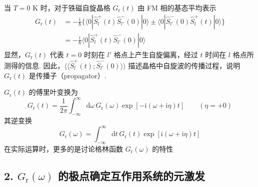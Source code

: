 当 $T=0$ K 时，对于铁磁自旋晶格 $G_{\mathrm{r}}(t)$ 由 FM 相的基态平均表示
\begin{equation*}
\begin{aligned}
G_{\mathrm{r}}(t)&=-\frac{\mathrm{i}}{\hbar}\bigl\{\langle0|
\hat{S}_{l}^{+}(t)\hat{S}_{l'}^{-}(0)|0\rangle
\pm\langle0|\hat{S}_{l'}^{-}(0)\hat{S}_{l}^{+}(t)|0\rangle\bigr\}\\
&=-\frac{\mathrm{i}}{\hbar}\langle0|\hat{S}_{l}^{+}(t)
\hat{S}_{l'}^{-}(0)|0\rangle
\end{aligned}
\end{equation*}
显然，$G_{\mathrm{r}}(t)$ 代表 $t=0$ 时刻在 $l'$ 格点上产生自旋偏离，经过 $t$ 时间在 $l$ 格点所测得的信息. 因此，$\langle\langle\hat{S}_{l}^{+}(t);\hat{S}_{l'}^{-}(0)\rangle\rangle$ 描述晶格中自旋波的传播过程，说明 $G_{\mathrm{r}}(t)$ 是传播子（propagator）.

$G_{\mathrm{r}}(t)$ 的傅里叶变换为
\begin{equation}
G_{\mathrm{r}}(t)=\frac{1}{2\pi}\int_{-\infty}^{\infty}
\mathrm{d}\omega\,G_{\mathrm{r}}(\omega)
\exp[-\mathrm{i}(\omega+\mathrm{i}\eta)t]\qquad(\eta=+0)
\end{equation}
其逆变换
\begin{equation}
G_{\mathrm{r}}(\omega)=\int_{-\infty}^{\infty}
\mathrm{d}t\,G_{\mathrm{r}}(t)\exp[\mathrm{i}(\omega+\mathrm{i}\eta)t]
\end{equation}
在实际运算时，更多的是讨论格林函数 $G_{\mathrm{r}}(\omega)$ 的特性

\subsection*{2. $G_{\mathrm{r}}(\omega)$ 的极点确定互作用系统的元激发}

